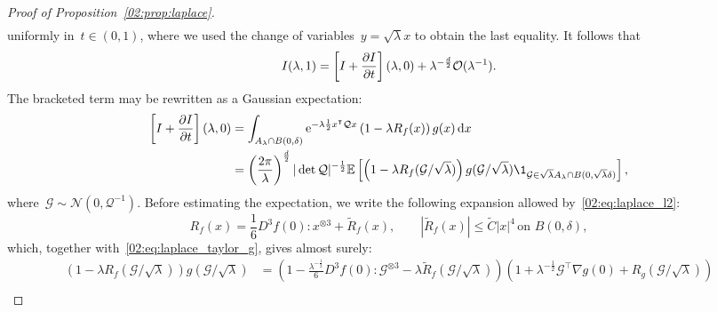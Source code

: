 \begin{proof}[Proof of Proposition~\ref{02:prop:laplace}]
\begin{equation}
\begin{aligned}
                \end{aligned}
            \end{equation}
            uniformly in~$t\in(0,1)$, where we used the change of variables~$y=\sqrt\lambda x$ to obtain the last equality.
            It follows that
            \begin{equation}
                \label{02:eq:laplace_expansion}
                I(\lambda,1) = \left[I + \frac{\partial I}{\partial t}\right](\lambda,0) + \lambda^{-\frac d2}\mathcal{O}(\lambda^{-1}).
            \end{equation}
            The bracketed term may be rewritten as a Gaussian expectation:
            \begin{equation}
                \begin{aligned}
                    \left[I + \frac{\partial I}{\partial t}\right](\lambda,0) &= \int_{A_\lambda \cap B(0,\delta)} \e^{-\lambda \frac12 x^\intercal \mathcal Q x}\left(1 - \lambda R_f(x)\right)g(x)\, \d x\\
                    &= \left(\frac{2\pi}{\lambda}\right)^{\frac d2}|\det \mathcal Q|^{-\frac12}\E\left[\left(1-\lambda R_f({\mathcal G}/\sqrt\lambda)\right)g({\mathcal G}/\sqrt\lambda)\1_{{\mathcal G} \in \sqrt\lambda A_\lambda \cap B(0,\sqrt\lambda \delta)}\right],
                \end{aligned}
            \end{equation}
            where~${\mathcal G}\sim\mathcal N(0,\mathcal Q^{-1})$.
            Before estimating the expectation, we write the following expansion allowed by~\eqref{02:eq:laplace_l2}:
            \begin{equation}
                \label{02:eq:laplace_taylor_f2}
                R_f(x) = \frac 16 D^3 f(0):x^{\otimes 3} + \widetilde R_f(x),\qquad \left|\widetilde R_f(x)\right|\leq \widetilde C |x|^4\, \text{on }B(0,\delta),
            \end{equation}
            which, together with~\eqref{02:eq:laplace_taylor_g}, gives almost surely:
            \begin{equation}
                \begin{aligned}
                    \left(1-\lambda R_f({\mathcal G}/\sqrt\lambda)\right)g({\mathcal G}/\sqrt\lambda) &= \left(1- \frac {\lambda^{-\frac12}}6 D^3 f(0):{\mathcal G}^{\otimes 3} - \lambda\widetilde R_f({\mathcal G}/\sqrt\lambda)\right)\left(1 + \lambda^{-\frac12}{\mathcal G}^\intercal \nabla g(0) + R_g({\mathcal G}/\sqrt\lambda)\right)\\

\end{aligned}
\end{equation}
\end{proof}
